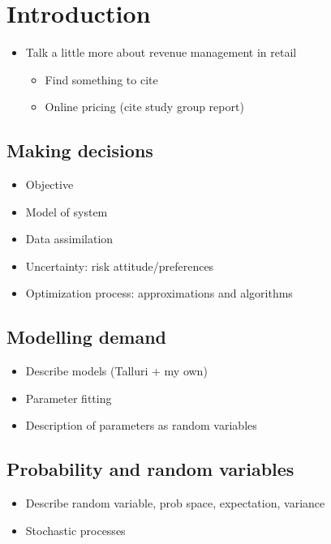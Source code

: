 \documentclass[main.tex]{subfiles}
\begin{document}
\chapter{Introduction}


\begin{itemize}
\item Talk a little more about revenue management in retail
\begin{itemize}
\item Find something to cite
\item Online pricing (cite  study group report)
\end{itemize}
\end{itemize}

\section{Making decisions}

\begin{itemize}
\item Objective
\item Model of system
\item Data assimilation
\item Uncertainty: risk attitude/preferences
\item Optimization process: approximations and algorithms
\end{itemize}


\section{Modelling demand}
\begin{itemize}
\item Describe models (Talluri + my own)
\item Parameter fitting
\item Description of parameters as random variables
\end{itemize}

\section{Probability and random variables}
\begin{itemize}
\item Describe random variable, prob space, expectation, variance
\item Stochastic processes
\end{itemize}
\end{document}
